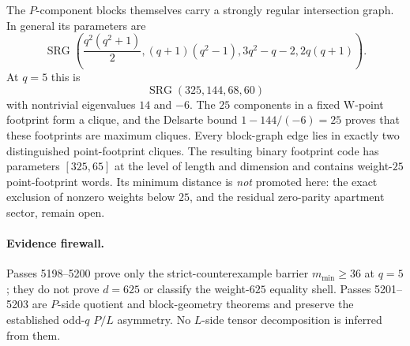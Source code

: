 The $P$-component blocks themselves carry a strongly regular intersection
graph.  In general its parameters are
\[
 \operatorname{SRG}\!\left(
 \frac{q^2(q^2+1)}2,
 (q+1)(q^2-1),
 3q^2-q-2,
 2q(q+1)
 \right).
\]
At $q=5$ this is
\[
 \operatorname{SRG}(325,144,68,60)
\]
with nontrivial eigenvalues $14$ and $-6$.  The $25$ components in a fixed
W-point footprint form a clique, and the Delsarte bound
$1-144/(-6)=25$ proves that these footprints are maximum cliques.  Every
block-graph edge lies in exactly two distinguished point-footprint cliques.
The resulting binary footprint code has parameters $[325,65]$ at the level of
length and dimension and contains weight-$25$ point-footprint words.
Its minimum distance is \emph{not} promoted here: the exact exclusion of
nonzero weights below $25$, and the residual zero-parity apartment sector,
remain open.

\paragraph{Evidence firewall.}
Passes 5198--5200 prove only the strict-counterexample barrier
$m_{\min}\ge36$ at $q=5$; they do not prove $d=625$ or classify the weight-$625$
equality shell.  Passes 5201--5203 are $P$-side quotient and block-geometry
theorems and preserve the established odd-$q$ $P/L$ asymmetry.  No $L$-side
tensor decomposition is inferred from them.
